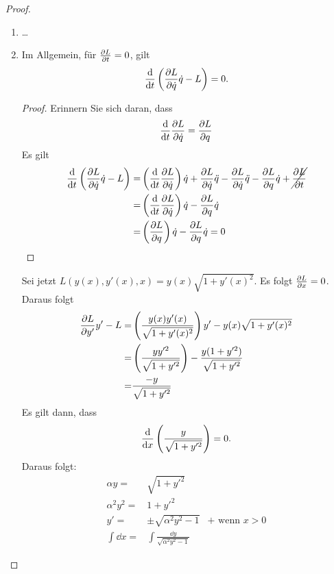 \begin{proof}
	\begin{enumerate}
		\item \ldots
		\item 
			\begin{Theorem}
				Im Allgemein, f\"{u}r $\pdv{L}{t}=0$, gilt
				\[
					\dv{t}\left( \pdv{L}{\dot{q}}\dot{q}-L \right) =0
				.\] 
			\end{Theorem}
			\begin{proof}
				Erinnern Sie sich daran, dass
				\begin{equation}\label{eq:theorMechanik2-1}
					\dv{t}\pdv{L}{\dot{q}}=\pdv{L}{q}
				\end{equation}
				Es gilt 
				\begin{align*}
	\dv{t}\left( \pdv{L}{\dot{q}}\dot{q}-L \right) =&\left( \dv{t}\pdv{L}{\dot{q}} \right) \dot{q}+\pdv{L}{\dot{q}}\ddot{q}-\pdv{L}{\dot{q}}\ddot{q}-\pdv{L}{q}\dot{q}+\cancel{\pdv{L}{t}}\\
	=&\left( \dv{t}\pdv{L}{\dot{q}} \right) \dot{q}-\pdv{L}{q}\dot{q}\\
	=&\left( \pdv{L}{q} \right) \dot{q}-\pdv{L}{q}	\dot{q}=0\qedhere
	\end{align*}
			\end{proof}
			Sei jetzt $L(y(x),y'(x),x)=y(x)\sqrt{1+y'(x)^2} $. Es folgt $\pdv{L}{x}=0$. Daraus folgt
			\begin{align*}
				\pdv{L}{y'}y'-L=&\left( \frac{y(x)y'(x)}{\sqrt{1+y'(x)^2} } \right) y'-y(x)\sqrt{1+y'(x)^2}\\
				=&\left( \frac{yy'^2}{\sqrt{1+y'^2} } \right) -\frac{y(1+y'^2)}{\sqrt{1+y'^2} }\\
				=&\frac{-y}{\sqrt{1+y'^2} }
			\end{align*}
			Es gilt dann, dass
			\[
				\dv{x}\left( \frac{y}{\sqrt{1+y'^2} } \right) =0
			.\] 
			Daraus folgt:
			\begin{align*}
				\alpha y=&\sqrt{1+y'^2} \\
				\alpha^2 y^2=& 1+y'^2\\
				y'=&\pm \sqrt{\alpha^2y^2-1} & +\text{ wenn }x>0\\
				\int\dd{x}=&	\int \frac{\dd y}{\sqrt{\alpha^2y^2-1} }
			\end{align*}
	\end{enumerate}
\end{proof}
